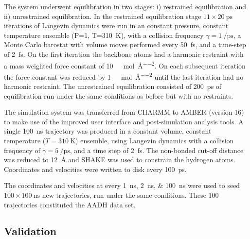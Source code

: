 The system underwent equilibration in two stages: i) restrained equilibration and ii) unrestrained equilibration. In the restrained equilibration stage $11 \times \SI{20}{\pico\second}$ iterations of Langevin dynamics were run in an constant pressure, constant temperature ensemble (P=\SI{1}{\atm}, T=\SI{310}{\kelvin}), with a collision frequency $\gamma=\SI{1}{\per\pico\second}$, a Monte Carlo barostat with volume moves performed every \SI{50}{\femto\second}, and a time-step of \SI{2}{\femto\second}. On the first iteration the backbone atoms had a harmonic restraint with a mass weighted force constant of  \SI{10}{\kilo\cal\per\mol\per\square\angstrom}. On each subsequent iteration the force constant was reduced by \SI{1}{\kilo\cal\per\mol\per\square\angstrom} until the last iteration had no harmonic restraint. The unrestrained equilibration consisted of \SI{200}{\pico\second} of equilibration run under the same conditions as before but with no restraints. 

The simulation system was transferred from CHARMM to AMBER (version 16) \cite{caseAMBER} to make use of the improved user interface and post-simulation analysis tools. A single  \SI{100}{\nano\second} trajectory was produced in a constant volume, constant temperature ($T=\SI{310}{\kelvin}$) ensemble, using Langevin dynamics with a collision frequency of $\gamma=\SI{5}{\per\pico\second}$, and a time step of \SI{2}{\femto\second}. The non-bonded cut-off distance was reduced to \SI{12}{\angstrom} and SHAKE \cite{ryckaertNumericalIntegrationCartesian1977b} was used to constrain the hydrogen atoms. Coordinates and velocities were written to disk every \SI{100}{\pico\second}.  

The coordinates and velocities at every \SIlist[list-final-separator = { ... }]{1; 2; 100}{\nano\second} were used to seed $100 \times \SI{100}{\nano\second}$ new trajectories, run under the same conditions. These \num{100} trajectories constituted the AADH data set. 

\subsection{Validation}\label{sec:aadh_validation}

